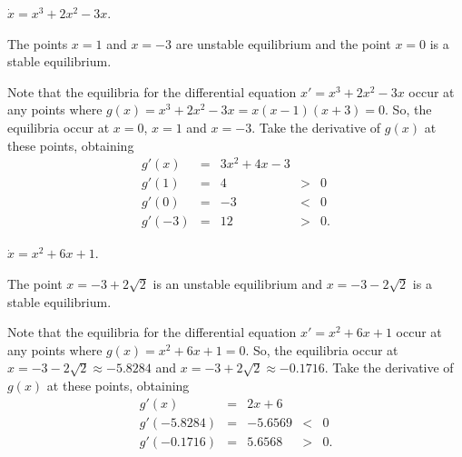 \documentclass{ximera}
\begin{document}
\begin{exercise} \label{c3.3.6C}
$\dot{x} = x^3 + 2x^2 - 3x$.

\begin{solution}

\ans The points $x=1$ and $x = -3$ are unstable equilibrium and the point 
$x = 0$ is a stable equilibrium.

\soln Note that the equilibria for the differential equation
$x' = x^3 + 2x^2 - 3x$ occur at any points where
$g(x) = x^3 + 2x^2 - 3x = x(x - 1)(x + 3) = 0$.
So, the equilibria occur at $x=0$, $x = 1$ and $x = -3$.  Take the
derivative of $g(x)$ at these points, obtaining
\[
\begin{array}{rcccl}
g'(x) & = & 3x^2+4x-3 \\
g'(1) & = & 4 & > & 0 \\
g'(0) & = & -3 & < & 0\\
g'(-3) & = & 12 & > & 0.\end{array}
\]

\end{solution}
\end{exercise}
\begin{exercise} \label{c3.3.6D}
$\dot{x} = x^2 + 6x + 1$.

\begin{solution}

\ans The point $x = -3+2\sqrt{2}$ is an unstable equilibrium and 
$x = -3-2\sqrt{2}$ is a stable equilibrium.

\soln Note that the equilibria for the differential equation
$x' = x^2 + 6x + 1$ occur at any points where
$g(x) = x^2 + 6x + 1 = 0$.  So, the equilibria occur at $x =
-3-2\sqrt{2}\approx -5.8284$ and $x = -3+2\sqrt{2}\approx -0.1716$.  Take the
derivative of $g(x)$ at these points, obtaining
\[
\begin{array}{rcccl}
g'(x) & = & 2x + 6 \\
g'(-5.8284) & = & -5.6569 & < & 0 \\
g'(-0.1716) & = & 5.6568 & > & 0.\end{array}
\]

\end{solution}
\end{exercise}
\end{document}
